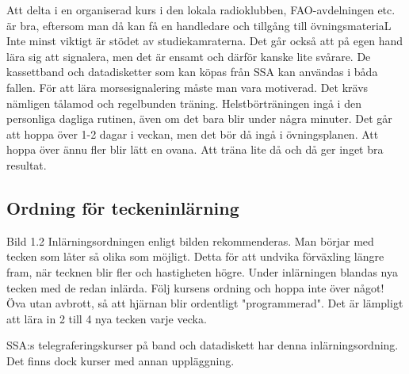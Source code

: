 \documentclass[a4paper,twoside,twocolumn,openright]{book}
\begin{document}
Att delta i en organiserad kurs i den lokala radioklubben, FAO-avdelningen etc. är bra,
eftersom man då kan få en handledare och tillgång till övningsmateriaL Inte minst viktigt
är stödet av studiekamraterna. Det går också att på egen hand lära sig att signalera, men
det är ensamt och därför kanske lite svårare. De kassettband och datadisketter som kan
köpas från SSA kan användas i båda fallen. För att lära morsesignalering måste man
vara motiverad. Det krävs nämligen tålamod och regelbunden träning. Helstbörträningen
ingå i den personliga dagliga rutinen, även om det bara blir under några minuter.
Det går att hoppa över 1-2 dagar i veckan, men det bör då ingå i övningsplanen. Att
hoppa över ännu fler blir lätt en ovana. Att träna lite då och då ger inget bra resultat.

\subsection{Ordning för teckeninlärning}

Bild 1.2
Inlärningsordningen enligt bilden rekommenderas. Man börjar med tecken som låter så
olika som möjligt. Detta för att undvika förväxling längre fram, när tecknen blir fler och
hastigheten högre. Under inlärningen blandas nya tecken med de redan inlärda. Följ
kursens ordning och hoppa inte över något!
Öva utan avbrott, så att hjärnan blir ordentligt "programmerad". Det är lämpligt att lära
in 2 till 4 nya tecken varje vecka.

SSA:s telegraferingskurser på band och datadiskett har denna inlärningsordning. Det
finns dock kurser med annan uppläggning.
\end{document}
